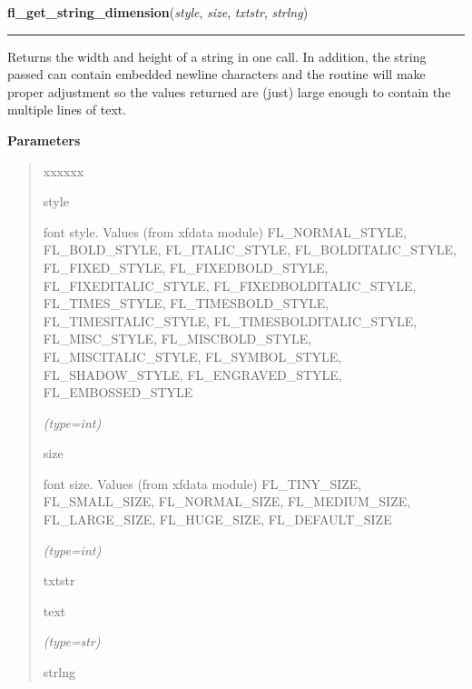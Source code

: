 \hspace{.8\funcindent}\begin{boxedminipage}{\funcwidth}

    \raggedright \textbf{fl\_get\_string\_dimension}(\textit{style}, \textit{size}, \textit{txtstr}, \textit{strlng})

    \vspace{-1.5ex}

    \rule{\textwidth}{0.5\fboxrule}
\setlength{\parskip}{2ex}
    Returns the width and height of a string in one call. In addition, the 
    string passed can contain embedded newline characters and the routine 
    will make proper adjustment so the values returned are (just) large 
    enough to contain the multiple lines of text.

\setlength{\parskip}{1ex}
      \textbf{Parameters}
      \vspace{-1ex}

      \begin{quote}
        \begin{Ventry}{xxxxxx}

          \item[style]

          font style. Values (from xfdata module) FL\_NORMAL\_STYLE, 
          FL\_BOLD\_STYLE, FL\_ITALIC\_STYLE, FL\_BOLDITALIC\_STYLE, 
          FL\_FIXED\_STYLE, FL\_FIXEDBOLD\_STYLE, FL\_FIXEDITALIC\_STYLE, 
          FL\_FIXEDBOLDITALIC\_STYLE, FL\_TIMES\_STYLE, 
          FL\_TIMESBOLD\_STYLE, FL\_TIMESITALIC\_STYLE, 
          FL\_TIMESBOLDITALIC\_STYLE, FL\_MISC\_STYLE, FL\_MISCBOLD\_STYLE,
          FL\_MISCITALIC\_STYLE, FL\_SYMBOL\_STYLE, FL\_SHADOW\_STYLE, 
          FL\_ENGRAVED\_STYLE, FL\_EMBOSSED\_STYLE

            {\it (type=int)}

          \item[size]

          font size. Values (from xfdata module) FL\_TINY\_SIZE, 
          FL\_SMALL\_SIZE, FL\_NORMAL\_SIZE, FL\_MEDIUM\_SIZE, 
          FL\_LARGE\_SIZE, FL\_HUGE\_SIZE, FL\_DEFAULT\_SIZE

            {\it (type=int)}

          \item[txtstr]

          text

            {\it (type=str)}

          \item[strlng]


\end{Ventry}
\end{quote}
\end{boxedminipage}
